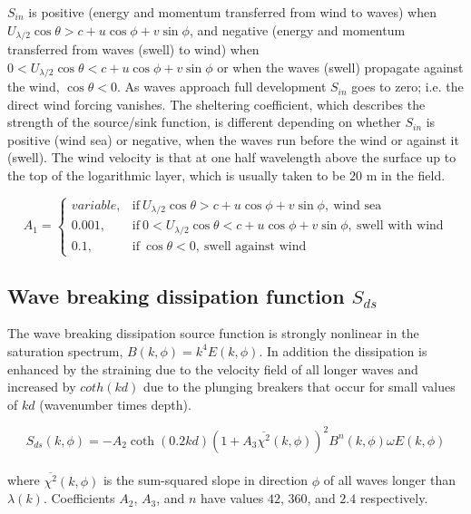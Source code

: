 \documentclass[letterpaper]{article}
\numberwithin{equation}{section}
\begin{document}
$S_{in}$ is positive (energy and momentum transferred from wind to waves)
when $U_{\lambda/2}\cos{\theta}>c+u\cos{\phi}+v\sin{\phi}$,
and negative (energy and momentum transferred from waves (swell) to wind)
when $0<U_{\lambda/2}\cos{\theta}<c+u\cos{\phi}+v\sin{\phi}$ or
when the waves (swell) propagate against the wind, $\cos{\theta}<0$.
As waves approach full development $S_{in}$ goes to zero; i.e. the direct wind forcing vanishes.
The sheltering coefficient, which describes the strength of the source/sink function,
is different depending on whether $S_{in}$ is positive (wind sea) or negative, when the waves
run before the wind or against it (swell).
The wind velocity is that at one half wavelength above the surface up to the top of the logarithmic layer,
which is usually taken to be $20$ m in the field.

\begin{equation}
  A_{1}=
  \begin{cases}
    variable, & \text{if}\ U_{\lambda/2}\cos{\theta}>c+u\cos{\phi}+v\sin{\phi},\   \text{wind sea} \\
    0.001, & \text{if}\ 0<U_{\lambda/2}\cos{\theta}<c+u\cos{\phi}+v\sin{\phi},\ \text{swell with wind} \\
    0.1,  & \text{if}\ \cos{\theta}<0,\   \text{swell against wind} 
  \end{cases}
\label{sin2}
\end{equation}

\subsection{Wave breaking dissipation function $S_{ds}$}

The wave breaking dissipation source function is strongly nonlinear 
in the saturation spectrum, $B(k,\phi)=k^{4}E(k,\phi)$. 
In addition the dissipation is enhanced by the straining due to the velocity field of all longer waves 
and increased by $coth(kd)$ due to the plunging breakers that occur for small values of $kd$ (wavenumber times depth). 

\begin{equation}
S_{ds}(k,\phi)=-A_{2}\coth(0.2kd)\left(1+A_{3}\overline{\chi^{2}}(k,\phi)\right)^{2}B^{n}(k,\phi)\omega E(k,\phi) 
\label{sds}
\end{equation}
\\
where $\overline{\chi^{2}}(k,\phi)$ is the sum-squared slope in direction $\phi$ of all waves longer than $\lambda(k)$.
Coefficients $A_{2}$, $A_{3}$, and $n$ have values $42$, $360$, and $2.4$ respectively.
\end{document}
